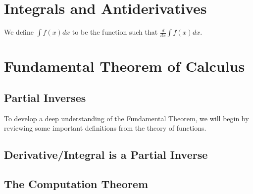 \documentclass{article}
\begin{document}
\section{Integrals and Antiderivatives}
\begin{definition}[Antiderivative]
    We define $\int f(x) dx$ to be the function such that $\frac{d}{dx} \int f(x) dx.$
    
\section{Fundamental Theorem of Calculus}
\subsection{Partial Inverses}
To develop a deep understanding of the Fundamental Theorem, we will begin by reviewing some important definitions from the theory of functions. 
\subsection{Derivative/Integral is a Partial Inverse}
\subsection{The Computation Theorem}
\end{definition}
\end{document}
